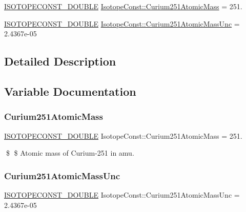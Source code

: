 \begin{DoxyCompactItemize}
\item 
\mbox{\hyperlink{group___isotope_const-_macros_ga8f45a7272ce02c0b4c65c44636ed719a}{I\+S\+O\+T\+O\+P\+E\+C\+O\+N\+S\+T\+\_\+\+D\+O\+U\+B\+LE}} \mbox{\hyperlink{group___isotope_const-_curium-_cm251_ga5e4a9259ef907396db30ec9d5328055c}{Isotope\+Const\+::\+Curium251\+Atomic\+Mass}} = 251.
\item 
\mbox{\hyperlink{group___isotope_const-_macros_ga8f45a7272ce02c0b4c65c44636ed719a}{I\+S\+O\+T\+O\+P\+E\+C\+O\+N\+S\+T\+\_\+\+D\+O\+U\+B\+LE}} \mbox{\hyperlink{group___isotope_const-_curium-_cm251_ga25b039772b007629795e8f074cf4d715}{Isotope\+Const\+::\+Curium251\+Atomic\+Mass\+Unc}} = 2.\+4367e-\/05
\end{DoxyCompactItemize}


\subsection{Detailed Description}


\subsection{Variable Documentation}
\mbox{\label{group___isotope_const-_curium-_cm251_ga5e4a9259ef907396db30ec9d5328055c}} 
\subsubsection{\texorpdfstring{Curium251\+Atomic\+Mass}{Curium251AtomicMass}}
{\footnotesize\ttfamily \mbox{\hyperlink{group___isotope_const-_macros_ga8f45a7272ce02c0b4c65c44636ed719a}{I\+S\+O\+T\+O\+P\+E\+C\+O\+N\+S\+T\+\_\+\+D\+O\+U\+B\+LE}} Isotope\+Const\+::\+Curium251\+Atomic\+Mass = 251.}

\$ \$ Atomic mass of Curium-\/251 in amu. \mbox{\label{group___isotope_const-_curium-_cm251_ga25b039772b007629795e8f074cf4d715}} 
\subsubsection{\texorpdfstring{Curium251\+Atomic\+Mass\+Unc}{Curium251AtomicMassUnc}}
{\footnotesize\ttfamily \mbox{\hyperlink{group___isotope_const-_macros_ga8f45a7272ce02c0b4c65c44636ed719a}{I\+S\+O\+T\+O\+P\+E\+C\+O\+N\+S\+T\+\_\+\+D\+O\+U\+B\+LE}} Isotope\+Const\+::\+Curium251\+Atomic\+Mass\+Unc = 2.\+4367e-\/05}

